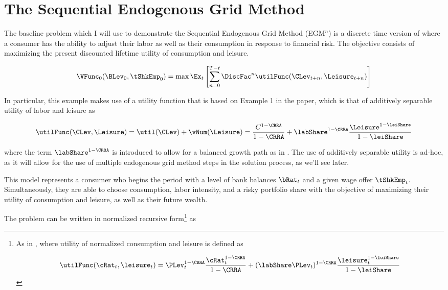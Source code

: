 \documentclass[\econtexRoot/SequentialEGM]{subfiles}
\begin{document}
\hypertarget{method}{}
\par\section{The Sequential Endogenous Grid Method}
\notinsubfile{\label{sec:method}}


The baseline problem which I will use to demonstrate the Sequential Endogenous Grid Method (EGM$^n$) is a discrete time version of \cite{Bodie1992-yp} where a consumer has the ability to adjust their labor as well as their consumption in response to financial risk. The objective consists of maximizing the present discounted lifetime utility of consumption and leisure.

\begin{equation}
	\VFunc_0(\BLev_0, \tShkEmp_0) = \max \Ex_{t} \left[ \sum_{n = 0}^{T-t} \DiscFac^{n} \utilFunc(\CLev_{t+n}, \Leisure_{t+n})  \right]
\end{equation}

In particular, this example makes use of a utility function that is based on Example 1 in the paper, which is that of additively separable utility of labor and leisure as

\begin{equation}
	\utilFunc(\CLev, \Leisure) = \util(\CLev) + \vNum(\Leisure) = \frac{C^{1-\CRRA}}{1-\CRRA} + \labShare^{1-\CRRA} \frac{\Leisure^{1-\leiShare}}{1-\leiShare}
\end{equation}

where the term $\labShare^{1-\CRRA}$ is introduced to allow for a balanced growth path as in \cite{Mertens2011-ap}. The use of additively separable utility is ad-hoc, as it will allow for the use of multiple endogenous grid method steps in the solution process, as we'll see later.

This model represents a consumer who begins the period with a level of bank balances $\bRat_{t}$ and a given wage offer $\tShkEmp_{t}$. Simultaneously, they are able to choose consumption, labor intensity, and a risky portfolio share with the objective of maximizing their utility of consumption and leisure, as well as their future wealth.

The problem can be written in normalized recursive form\footnote{
	As in \cite{Carroll2009-zq}, where utility of normalized consumption and leisure is defined as

	\begin{equation}
		\utilFunc(\cRat_{t}, \leisure_{t}) = \PLev_{t}^{1-\CRRA} \frac{\cRat_{t}^{1-\CRRA}}{1-\CRRA} + (\labShare\PLev_{t})^{1-\CRRA} \frac{\leisure_{t}^{1-\leiShare}}{1-\leiShare}
	\end{equation}

} as
\end{document}
